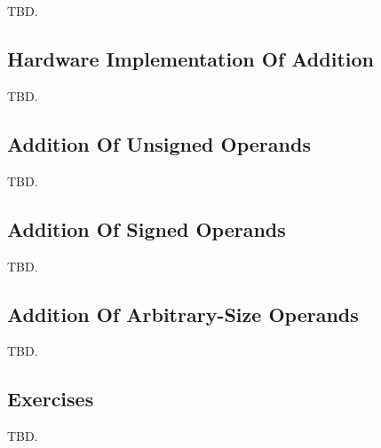 \chapter{\caddzerolongtitle{}}

\label{cadd0}

TBD.

\section{Hardware Implementation Of Addition}

TBD.


\section{Addition Of Unsigned Operands}

TBD.


\section{Addition Of Signed Operands}

TBD.


\section{Addition Of Arbitrary-Size Operands}

TBD.


\section{Exercises}

TBD.



